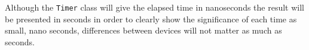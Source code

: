 Although the \texttt{Timer} class will give the elapsed time in nanoseconds the result will be presented in seconds in order to clearly show the significance of each time as small, nano seconds, differences between devices will not matter as much as seconds.

%       
%
